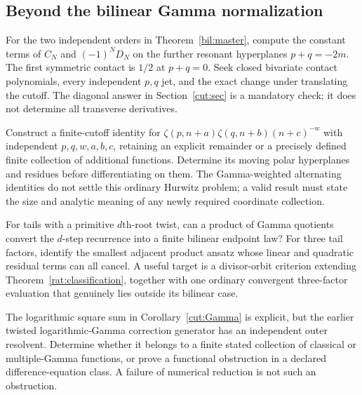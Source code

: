 \subsection{Beyond the bilinear Gamma normalization}

\begin{question}
For the two independent orders in Theorem~\ref{bil:master}, compute
the constant terms of $C_N$ and $(-1)^ND_N$ on the further resonant
hyperplanes $p+q=-2m$. The first symmetric contact is $1/2$ at
$p+q=0$. Seek closed bivariate contact polynomials, every independent
$p,q$ jet, and the exact change under translating the cutoff.
The diagonal answer in Section~\ref{cut:sec} is a mandatory check;
it does not determine all transverse derivatives.
\end{question}

\begin{question}
Construct a finite-cutoff identity for
$\zeta(p,n+a)\zeta(q,n+b)(n+c)^{-w}$ with independent
$p,q,w,a,b,c$, retaining an explicit remainder or a precisely defined
finite collection of additional functions. Determine its moving
polar hyperplanes and residues before differentiating on them.
The Gamma-weighted alternating identities do not settle this ordinary
Hurwitz problem; a valid result must state the size and analytic
meaning of any newly required coordinate collection.
\end{question}

\begin{question}
For tails with a primitive $d$th-root twist, can a product of Gamma
quotients convert the $d$-step recurrence into a finite bilinear
endpoint law? For three tail factors, identify the smallest adjacent
product ansatz whose linear and quadratic residual terms can all
cancel. A useful target is a divisor-orbit criterion extending
Theorem~\ref{rat:classification}, together with one ordinary convergent
three-factor evaluation that genuinely lies outside its bilinear case.
\end{question}

\begin{question}
The logarithmic square sum in Corollary~\ref{cut:Gamma} is explicit,
but the earlier twisted logarithmic-Gamma correction generator has
an independent outer resolvent. Determine whether it belongs to a
finite stated collection of classical or multiple-Gamma functions,
or prove a functional obstruction in a declared difference-equation
class. A failure of numerical reduction is not such an obstruction.
\end{question}


